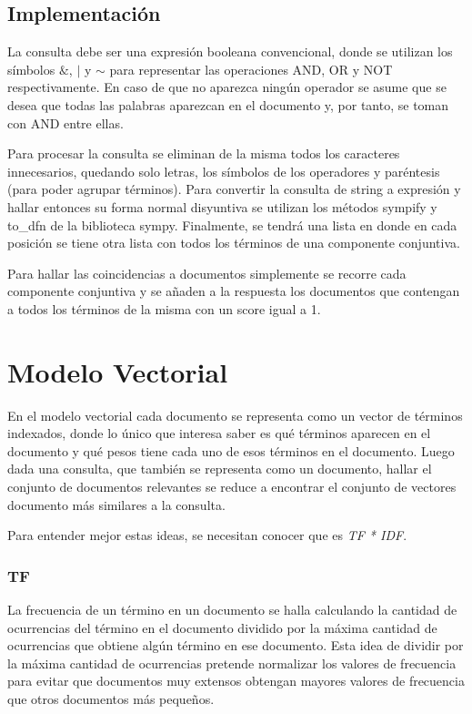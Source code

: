 \documentclass{llncs}
\begin{document}
	\subsection{Implementaci\'on}

	La consulta debe ser una expresi\'on booleana convencional, donde se utilizan los s\'imbolos $ \& $, $ | $ y $ \sim $  para representar las operaciones AND, OR y NOT respectivamente. En caso de que no aparezca ning\'un operador se asume que se desea que todas las palabras aparezcan en el documento y, por tanto, se toman con AND entre ellas. 
	
	Para procesar la consulta se eliminan de la misma todos los caracteres innecesarios, quedando solo letras, los s\'imbolos de los operadores y par\'entesis (para poder agrupar t\'erminos). Para convertir la consulta de string a expresi\'on y hallar entonces su forma normal disyuntiva se utilizan los m\'etodos sympify y to\_dfn de la biblioteca sympy. Finalmente, se tendr\'a una lista en donde en cada posici\'on se tiene otra lista con todos los t\'erminos de una componente conjuntiva.
	
	Para hallar las coincidencias a documentos simplemente se recorre cada componente conjuntiva y se a\~naden a la respuesta los documentos que contengan a todos los t\'erminos de la misma con un score igual a 1.  
	
	\section{Modelo Vectorial}

    En el modelo vectorial cada documento se representa como un vector de términos indexados, donde lo único que interesa saber es qué términos aparecen en el documento y qué pesos tiene cada uno de esos términos en el documento. Luego dada una consulta, que también se representa como un documento, hallar el conjunto de documentos relevantes se reduce a encontrar el conjunto de vectores documento más similares a la consulta.

    Para entender mejor estas ideas, se necesitan conocer que es \emph{TF * IDF}.
        
    \subsubsection{TF} La frecuencia de un término en un documento se halla calculando la cantidad de ocurrencias del término en el documento dividido por la máxima cantidad de ocurrencias que obtiene algún término en ese documento. Esta idea de dividir por la máxima cantidad de ocurrencias pretende normalizar los valores de frecuencia para evitar que documentos muy extensos obtengan mayores valores de frecuencia que otros documentos más pequeños. 
\end{document}
